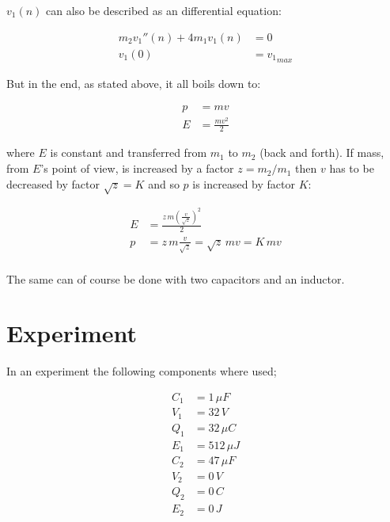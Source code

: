\documentclass[]{elementary-physics}
\begin{document}
$v_1(n)$ can also be described as an differential equation:

\begin{subequations}
\begin{align}
m_2 v_1''(n) + 4 m_1 v_1(n) &= 0 \\
v_1(0) &= {v_1}_{max}
\end{align}
\end{subequations}

But in the end, as stated above, it all boils down to:

\begin{subequations}
\begin{align}
p &= m v\\
E &= \frac{m v^2}{2}
\end{align}
\end{subequations}

where $E$ is constant and transferred from $m_1$ to $m_2$ (back and forth).
If mass, from $E$'s point of view, is increased by a factor $z=m_2/m_1$ then $v$ has to be decreased by factor $\sqrt{z}=K$ and so $p$ is increased by factor $K$:

\begin{subequations}
\begin{align}
E &= \frac{z\,m \left( \frac{v}{\sqrt{z}} \right)^2}{2} \\
p &= z\,m \frac{v}{\sqrt{z}} = \sqrt{z}\,m v = K\,m v \\
\end{align}
\end{subequations}

The same can of course be done with two capacitors and an inductor.

\pagebreak

\section{Experiment}

In an experiment the following components where used;

\begin{subequations}
\begin{align}
C_1 &= 1 \, \mu F \\
V_1 &= 32 \, V \\
Q_1 &= 32 \, \mu C \\
E_1 &= 512 \, \mu J \\
C_2 &= 47 \, \mu F \\
V_2 &= 0 \, V \\
Q_2 &= 0 \, C \\
E_2 &= 0 \, J
\end{align}
\end{subequations}
\end{document}
